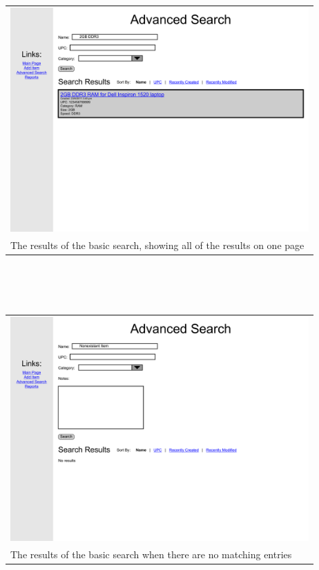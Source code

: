 \documentclass{article}
\begin{document}
\begin{tabular}{ p{4.5in} }
\includegraphics[keepaspectratio, width=4.5in]{basicSearchF0S1.pdf} \\
The results of the basic search, showing all of the results on one page
\end{tabular}\\
~\\
~\\
\begin{tabular}{ p{4.5in} }
\includegraphics[keepaspectratio, width=4.5in]{basicSearchF2S1.pdf} \\
The results of the basic search when there are no matching entries
\end{tabular}\\
~\\
~\\
\end{document}
